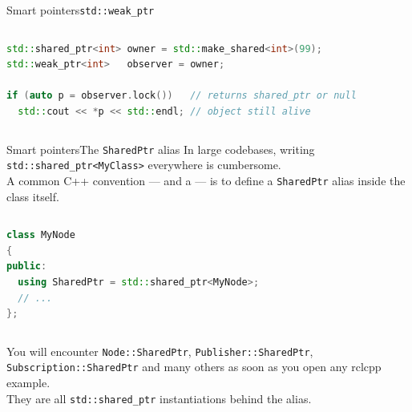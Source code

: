 \begin{frame}[fragile]{Smart pointers}{\texttt{std::weak\_ptr}}
	\begin{columns}
		\begin{lstlisting}[style=codebeamer, language=C++, caption=Promoting a \texttt{weak\_ptr} to check if the object is still alive.]
std::shared_ptr<int> owner = std::make_shared<int>(99);
std::weak_ptr<int>   observer = owner;

if (auto p = observer.lock())   // returns shared_ptr or null
  std::cout << *p << std::endl; // object still alive
    \end{lstlisting}
	\end{columns}
\end{frame}
\begin{frame}[fragile]{Smart pointers}{The \texttt{SharedPtr} alias}
	\justifying
	In large codebases, writing \texttt{std::shared\_ptr<MyClass>} everywhere is cumbersome.\\
	A common C++ convention — and a  — is to define a \texttt{SharedPtr} alias inside the class itself.
	\begin{columns}
		\column{.9\textwidth}
		\begin{lstlisting}[style=codebeamer, language=C++, caption=The \texttt{SharedPtr} alias as used in ROS 2 classes.]
class MyNode
{
public:
  using SharedPtr = std::shared_ptr<MyNode>;
  // ...
};
    \end{lstlisting}
	\end{columns}
	You will encounter \texttt{Node::SharedPtr}, \texttt{Publisher::SharedPtr}, \texttt{Subscription::SharedPtr} and many others as soon as you open any rclcpp example.\\
	They are all \texttt{std::shared\_ptr} instantiations behind the alias.
\end{frame}

